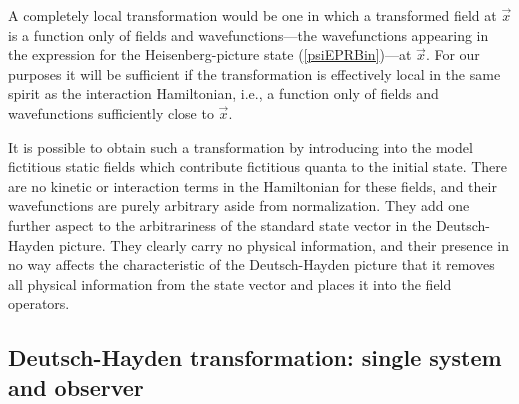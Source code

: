 \documentclass[12pt]{article}
\begin{document}
A completely local transformation would be one in which a transformed field at $\vec{x}$\/
is a function only of fields and wavefunctions---the wavefunctions appearing in the expression
for the Heisenberg-picture state (\ref{psiEPRBin})---at $\vec{x}$\/.
For our purposes it will be sufficient if the transformation
is effectively local in the same spirit as the interaction Hamiltonian, i.e., a function only 
of fields and wavefunctions sufficiently close to $\vec{x}$\/.



It is possible to obtain such a transformation by introducing into the model fictitious static  fields which contribute
fictitious quanta to the initial state. There are no kinetic or interaction terms in the Hamiltonian
for these fields, and their wavefunctions are purely arbitrary aside from normalization. They add one further aspect to the arbitrariness
of the standard state vector in the Deutsch-Hayden picture. They clearly carry no physical information, and their
presence in no way affects the characteristic of the Deutsch-Hayden picture that it removes all physical information
from the state vector and places it into the field operators. 

\subsection{Deutsch-Hayden transformation: single system and observer}\label{SecTransformationSingle}
\end{document}

